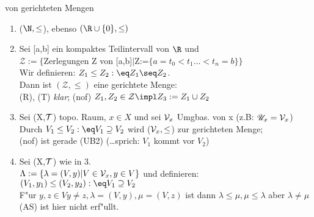 \begin{beispiel}\label{3.3}von gerichteten Mengen
\begin{enumerate}
\item ($\N ,\leq$), ebenso $(\R\cup\{ 0\} ,\leq )$
\item Sei [a,b] ein kompaktes Teilintervall von $\R$ und \\
${\mathcal Z} :=\{$Zerlegungen Z von [a,b]$|$Z:=$\{ a=t_0<t_1\dots <t_n=b\}\}$\\
Wir definieren: $Z_1\leq Z_2:\eq Z_1\seq Z_2$. \\
Dann ist $({\mathcal Z} ,\leq )$ eine gerichtete Menge:\\
(R), (T) {\it klar}; (nof) $Z_1,Z_2\in{\mathcal Z}\impl Z_3:=Z_1\cup Z_2$
\item Sei (X,$\mathcal T$) topo. Raum, $x\in X$ und sei ${\mathcal V}_{x}$ Umgbas. von x (z.B: ${\mathscr U}_{x}={\mathcal V}_{x}$)\\
Durch $V_1\leq V_2:\eq V_1\supseteq V_2$ wird (${\mathcal V}_{x} ,\leq$) zur gerichteten Menge;\\
(nof) ist gerade (UB2) (\dots sprich: $V_1$ kommt vor $V_2$)
\item Sei (X,$\mathcal T$) wie in 3.\\ 
\hspace*{2cm}$\Lambda:=\{\lambda = (V,y)|V\in{\mathcal V}_{x},y\in V\}$ und definieren:\\
\hspace*{2cm}$(V_1,y_1)\leq (V_2,y_2):\eq V_1\supseteq V_2$\\
F"ur $y,z\in V y\neq z, \lambda=(V,y) , \mu =(V,z)$ ist dann $\lambda\leq\mu , \mu\leq\lambda$ aber $\lambda\neq\mu$ (AS) ist hier nicht erf"ullt.
\end{enumerate}
\end{beispiel}

